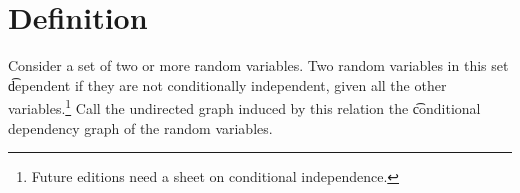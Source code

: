 
\section*{Definition}

Consider a set of two or more random variables.
Two random variables in this set \t{dependent} if they are not conditionally independent, given all the other variables.\footnote{Future editions need a sheet on conditional independence.}
Call the undirected graph induced by this relation the \t{conditional dependency graph} of the random variables.

\blankpage